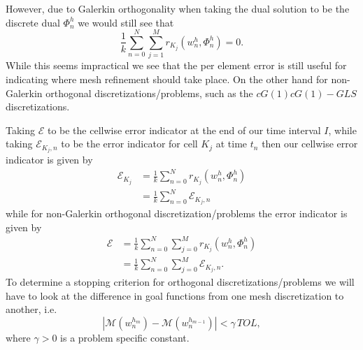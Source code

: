 However, due to Galerkin orthogonality when taking the dual solution to be
the discrete dual $\Phi^h_n$ we would still see that
\begin{equation*}
    \frac{1}{k} \sum_{n=0}^N \sum_{j=1}^M r_{K_j}(w^h_n, \Phi^h_n) = 0.
\end{equation*}
While this seems impractical we see that the per element error is still useful
for indicating where mesh refinement should take place. On the other hand for
non-Galerkin orthogonal discretizations/problems, such as the $cG(1)cG(1)-GLS$
discretizations.

Taking $\mathcal{E}$ to be the cellwise error indicator at the end of our time
interval $I$, while taking $\mathcal{E}_{K_j, n}$ to be
the error indicator for cell $K_j$ at time $t_n$ then our cellwise error
indicator is given by
\begin{equation}
    \begin{split}
        \mathcal{E}_{K_j} &= \frac{1}{k} \sum_{n=0}^N r_{K_j}(w^h_n, \Phi^h_n) \\
                &= \frac{1}{k} \sum_{n=0}^N \mathcal{E}_{K_j, n}
    \end{split}
    \label{eq:CellErrorIndicator}
\end{equation}
while for non-Galerkin orthogonal discretization/problems the error indicator is
given by
\begin{equation}
    \begin{split}
        \mathcal{E} &= \frac{1}{k} \sum_{n=0}^N \sum_{j=0}^M r_{K_j}(w^h_n, \Phi^h_n) \\
            &= \frac{1}{k} \sum_{n=0}^N \sum_{j=0}^M  \mathcal{E}_{K_j, n}.
    \end{split}
    \label{eq:ErrorIndicator}
\end{equation}
To determine a stopping criterion for orthogonal discretizations/problems we
will have to look at the difference in goal functions from one mesh
discretization to another, i.e.
\begin{equation}
     \left|\mathcal{M}(w^{h_m}_n) - \mathcal{M}(w^{h_{m-1}}_n)\right|
        < \gamma\, TOL,
    \label{eq:OrthogonalError}
\end{equation}
where $\gamma>0$ is a problem specific constant.

